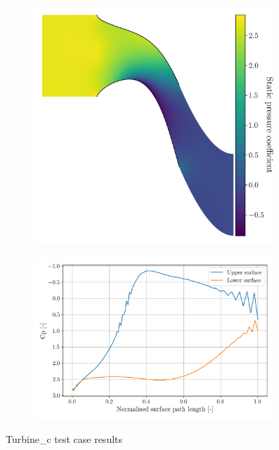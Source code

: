 \documentclass{article}
\begin{document}
\begin{figure}[H]
    \centering
    \begin{subfigure}{0.44\textwidth}
        \centering
        \includegraphics[width=0.99\textwidth]{figures/turbine_h_cp.png}
        \caption{}
        \label{fig:turbine_h_cp}
    \end{subfigure}
    \begin{subfigure}{0.55\textwidth}
        \centering
        \includegraphics[width=0.99\textwidth]{figures/turbine_h_surface_cp.png}
        \caption{}
        \label{fig:turbine_h_surface_cp}
    \end{subfigure}
    \caption{Turbine\_c test case results}
\end{figure}
\end{document}

